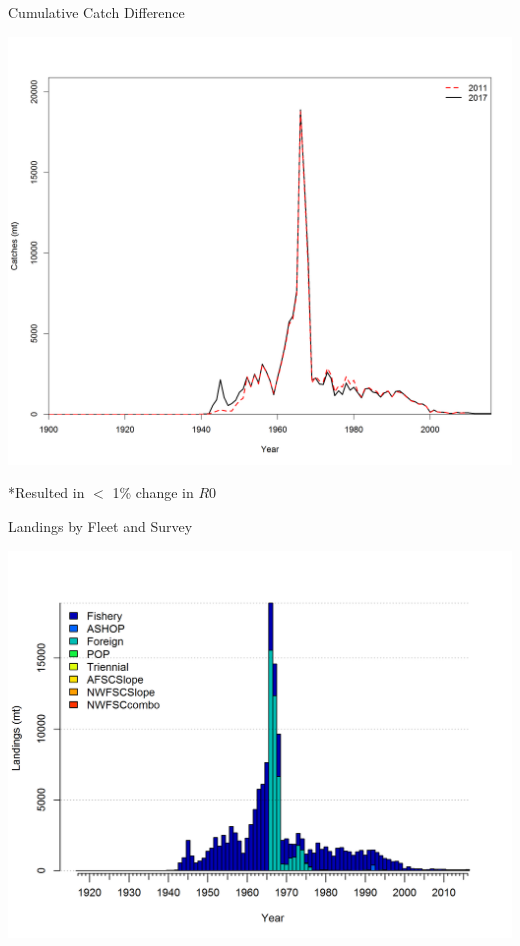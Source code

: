 \documentclass[pdf]{beamer}\usepackage[]{graphicx}\usepackage[]{color}
\begin{document}
\begin{frame}{Cumulative Catch Difference}
  \begin{center}
    \includegraphics[scale = 0.32, trim={0, 0, 0, 2cm}, clip]{figures/Catch_Comparison.png}
  \end{center}
  *Resulted in $<$ 1\% change in $R0$ 
\end{frame}


\begin{frame}{Landings by Fleet and Survey}
  \begin{center}
    \includegraphics[scale = 0.60]{figures/catch2_landings_stacked.png}
  \end{center}
\end{frame}
\end{document}
